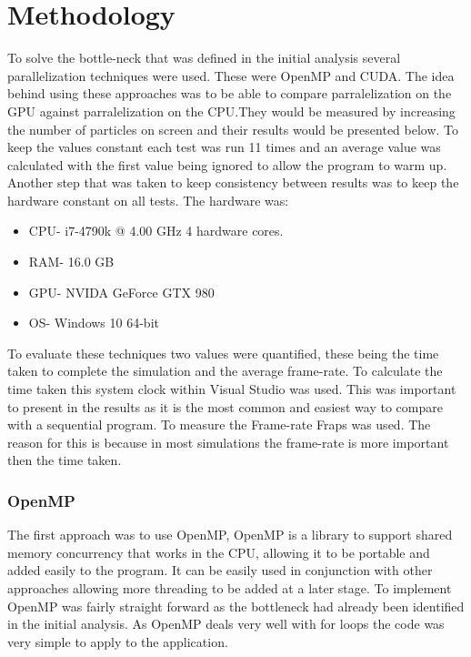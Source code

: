 \documentclass[12pt]{article}
\begin{document}
\section{Methodology}
To solve the bottle-neck that was defined in the initial analysis several parallelization techniques were used. These were OpenMP and CUDA. The idea behind using these approaches was to be able to compare parralelization on the GPU against  parralelization on the CPU.They would be measured by increasing the number of particles on screen and their results would be presented below.
\newline
To keep the values constant each test was run 11 times and an average value was calculated with the first value being ignored to allow the program to warm up. Another step that was taken to keep consistency between results was to keep the hardware constant on all tests. The hardware was:
\begin{itemize}
	\item CPU- i7-4790k @ 4.00 GHz 4 hardware cores.
	\item RAM- 16.0 GB
	\item GPU- NVIDA GeForce GTX 980
	\item OS- Windows 10 64-bit
\end{itemize}
 To evaluate these techniques two values were quantified, these being the time taken to complete the simulation and the average frame-rate. To calculate the time taken this system clock within Visual Studio was used. This was important to present in the results as it is the most common and easiest way to compare with a sequential program. To measure the Frame-rate Fraps was used. The reason for this is because in most simulations the frame-rate is more important then the time taken. 

\subsubsection{OpenMP}
The first approach was to use OpenMP, OpenMP is a library to support shared memory concurrency that works in the CPU, allowing it to be portable and added easily to the program. It can  be easily used in conjunction with other approaches allowing more threading to be added at a later stage.
\newline 
To implement OpenMP was fairly straight forward as the bottleneck had already been identified in the initial analysis. As OpenMP deals very well with for loops the code was very simple to apply to the application.
\end{document}
